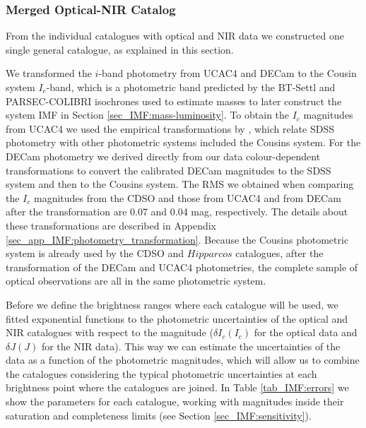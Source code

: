 \documentclass[12pt]{article}
\newcounter{subsubsubsection}[subsubsection]
\begin{document}
\subsubsection{Merged Optical-NIR Catalog}
\label{sec_IMF:merged_cat}

From the individual catalogues with optical and NIR data we constructed one single general catalogue, as explained in this section.

\label{sec_IMF:photometry_transformation}
We transformed the $i$-band photometry from UCAC4 and DECam to the Cousin system $I_c$-band, which is a photometric band predicted by the BT-Settl \citep{Baraffe2015} and \ac{PARSEC-COLIBRI} \citep{Marigo2017} isochrones used to estimate masses to later construct the system IMF in Section \ref{sec_IMF:mass-luminosity}. To obtain the $I_c$ magnitudes from UCAC4 we used the empirical transformations by \citet{Jordi2006}, which relate SDSS photometry with other photometric systems included the Cousins system. For the DECam photometry we derived directly from our data colour-dependent transformations to convert the calibrated DECam magnitudes to the SDSS system and then to the Cousins system. The RMS we obtained when comparing the $I_c$ magnitudes from the CDSO and those from UCAC4 and from DECam after the transformation are 0.07 and 0.04 mag, respectively. The details about these transformations are described in Appendix \ref{sec_app_IMF:photometry_transformation}. Because the Cousins photometric system is already used by the CDSO and $Hipparcos$ catalogues, after the transformation of the DECam and UCAC4 photometries, the complete sample of optical observations are all in the same photometric system.

\label{sec_IMF:photometry_uncertainties}
Before we define the brightness ranges where each catalogue will be used, we fitted exponential functions to the photometric uncertainties of the optical and NIR catalogues with respect to the magnitude ($\delta I_c(I_c)$ for the optical data and $\delta J(J)$ for the NIR data). This way we can estimate the uncertainties of the data as a function of the photometric magnitudes, which will allow us to combine the catalogues considering the typical photometric uncertainties at each brightness point where the catalogues are joined. In Table \ref{tab_IMF:errors} we show the parameters for each catalogue, working with magnitudes inside their saturation and completeness limits (see Section \ref{sec_IMF:sensitivity}).
\end{document}
